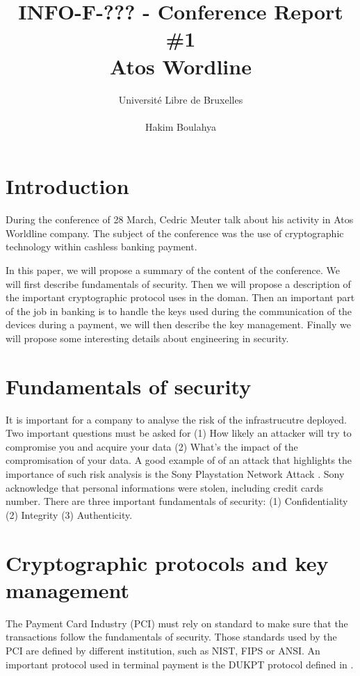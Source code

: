 \documentclass[10pt,a4paper]{article}
\title{INFO-F-??? - Conference Report \#1 \\
Atos Wordline}
\author{Université Libre de Bruxelles \\
\\ Hakim Boulahya}
\begin{document}
\maketitle


\section{Introduction}

During the conference of 28 March, Cedric Meuter
talk about his activity in Atos Worldline company.
The subject of the conference was the use of
cryptographic technology within cashless banking payment.

In this paper, we will propose a summary of the content of the
conference. We will first describe fundamentals of security.
Then we will propose a description of the important
cryptographic protocol uses in the doman. Then an important
part of the job in banking is to handle the keys used
during the communication of the devices during a payment,
we will then describe the key management.
Finally we will propose some interesting details about
engineering in security.


\section{Fundamentals of security}

It is important for a company to analyse the risk
of the infrastrucutre deployed. Two important questions must
be asked for (1) How likely an attacker will try to compromise
you and acquire your data (2) What's the impact of the compromisation
of your data. A good example of of an attack that highlights
the importance of such risk analysis is the Sony Playstation Network
Attack \cite{raiu_cyber-threat_2012}. Sony acknowledge that
personal informations were stolen, including credit cards number.
There are three important fundamentals of security:
(1) Confidentiality (2) Integrity (3) Authenticity.

\section{Cryptographic protocols and key management}

The Payment Card Industry (PCI) must rely on standard to make
sure that the transactions follow the fundamentals of security.
Those standards used by the PCI are defined by different institution, such
as NIST, FIPS or ANSI. An important protocol used in terminal payment
is the DUKPT protocol defined in \cite{dukpt_std}.
\end{document}

